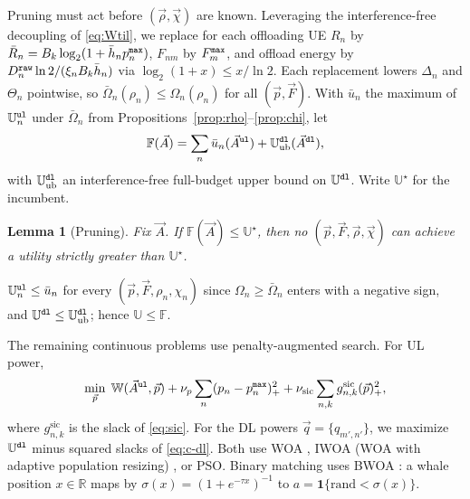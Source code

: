 \documentclass[journal]{IEEEtran}
\newtheorem{lemma}{Lemma}
\begin{document}
{\color{blue}Pruning must act before $(\vec{\rho},\vec{\chi})$ are known. Leveraging the interference-free decoupling of \eqref{eq:Wtil}, we replace for each offloading UE $R_n$ by $\bar R_n=B_k\log_2(1+\bar h_np_n^{\tt max})$, $F_{nm}$ by $F_m^{\tt max}$, and offload energy by $D_n^{\tt raw}\ln2/(\xi_nB_k\bar h_n)$ via $\log_2(1+x)\le x/\ln2$. Each replacement lowers $\Delta_n$ and $\Theta_n$ pointwise, so $\bar\Omega_n(\rho_n)\le\Omega_n(\rho_n)$ for all $(\vec{p},\vec{F})$. With $\bar u_n$ the maximum of $\mathbb{U}_n^{\tt ul}$ under $\bar\Omega_n$ from Propositions~\ref{prop:rho}--\ref{prop:chi}, let}
\begin{equation}
\mathbb{F}(\vec{A})=\sum_{n}\bar u_n(\vec{A}^{\tt ul})+\mathbb{U}^{\tt dl}_{\mathrm{ub}}(\vec{A}^{\tt dl}),
\label{eq:Fbound}
\end{equation}
{\color{blue}with $\mathbb{U}^{\tt dl}_{\mathrm{ub}}$ an interference-free full-budget upper bound on $\mathbb{U}^{\tt dl}$. Write $\mathbb{U}^\star$ for the incumbent.}

\begin{lemma}[Pruning]\label{lem:prune}
{\color{blue}Fix $\vec{A}$. If $\mathbb{F}(\vec{A})\le\mathbb{U}^\star$, then no $(\vec{p},\vec{F},\vec{\rho},\vec{\chi})$ can achieve a utility strictly greater than $\mathbb{U}^\star$.}
\end{lemma}
\begin{IEEEproof}
$\mathbb{U}_n^{\tt ul}\le\bar u_n$ for every $(\vec{p},\vec{F},\rho_n,\chi_n)$ since $\Omega_n\ge\bar\Omega_n$ enters with a negative sign, and $\mathbb{U}^{\tt dl}\le\mathbb{U}^{\tt dl}_{\mathrm{ub}}$; hence $\mathbb{U}\le\mathbb{F}$.
\end{IEEEproof}

The remaining continuous problems use penalty-augmented search. For UL power,
\begin{equation}
\min_{\vec{p}}\;
\mathbb{W}(\vec{A}^{\tt ul},\vec{p})
+\nu_p\sum_n(p_n-p_n^{\tt max})_+^2
+\nu_{\mathrm{sic}}\sum_{n,k}g_{n,k}^{\mathrm{sic}}(\vec{p})_+^2,
\label{eq:mpc}
\end{equation}
where $g_{n,k}^{\mathrm{sic}}$ is the slack of \eqref{eq:sic}. For the DL powers $\vec{q}=\{q_{m',n'}\}$, we maximize $\mathbb{U}^{\tt dl}$ minus squared slacks of \eqref{eq:c-dl}. Both use WOA \cite{mirjalili2016whale}, IWOA (WOA with adaptive population resizing) \cite{Hoang_TCOM_2024}, or PSO. Binary matching uses BWOA \cite{kumar2020binary}: a whale position $x\in\mathbb{R}$ maps by $\sigma(x)=(1+e^{-\tau x})^{-1}$ to $a=\mathbf{1}\{\mathrm{rand}<\sigma(x)\}$.
\end{document}
